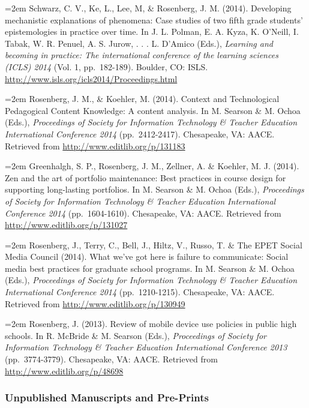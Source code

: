 \documentclass[]{article}
\begin{document}
\hangindent=2em Schwarz, C. V., Ke, L., Lee, M, \& Rosenberg, J. M.
(2014). Developing mechanistic explanations of phenomena: Case studies
of two fifth grade students' epistemologies in practice over time. In J.
L. Polman, E. A. Kyza, K. O'Neill, I. Tabak, W. R. Penuel, A. S. Jurow,
. . . L. D'Amico (Eds.), \emph{Learning and becoming in practice: The
international conference of the learning sciences (ICLS) 2014} (Vol. 1,
pp.~182-189). Boulder, CO: ISLS.
\url{http://www.isls.org/icls2014/Proceedings.html}

\hangindent=2em Rosenberg, J. M., \& Koehler, M. (2014). Context and
Technological Pedagogical Content Knowledge: A content analysis. In M.
Searson \& M. Ochoa (Eds.), \emph{Proceedings of Society for Information
Technology \& Teacher Education International Conference 2014}
(pp.~2412-2417). Chesapeake, VA: AACE. Retrieved from
\url{http://www.editlib.org/p/131183}

\hangindent=2em Greenhalgh, S. P., Rosenberg, J. M., Zellner, A. \&
Koehler, M. J. (2014). Zen and the art of portfolio maintenance: Best
practices in course design for supporting long-lasting portfolios. In M.
Searson \& M. Ochoa (Eds.), \emph{Proceedings of Society for Information
Technology \& Teacher Education International Conference 2014}
(pp.~1604-1610). Chesapeake, VA: AACE. Retrieved from
\url{http://www.editlib.org/p/131027}

\hangindent=2em Rosenberg, J., Terry, C., Bell, J., Hiltz, V., Russo, T.
\& The EPET Social Media Council (2014). What we've got here is failure
to communicate: Social media best practices for graduate school
programs. In M. Searson \& M. Ochoa (Eds.), \emph{Proceedings of Society
for Information Technology \& Teacher Education International Conference
2014} (pp.~1210-1215). Chesapeake, VA: AACE. Retrieved from
\url{http://www.editlib.org/p/130949}

\hangindent=2em Rosenberg, J. (2013). Review of mobile device use
policies in public high schools. In R. McBride \& M. Searson (Eds.),
\emph{Proceedings of Society for Information Technology \& Teacher
Education International Conference 2013} (pp.~3774-3779). Chesapeake,
VA: AACE. Retrieved from \url{http://www.editlib.org/p/48698}

\subsubsection{Unpublished Manuscripts and
Pre-Prints}\label{unpublished-manuscripts-and-pre-prints}
\end{document}
